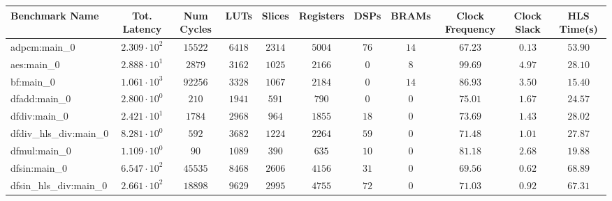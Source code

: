 \begin{tabular}{|l|c|c|c|c|c|c|c|c|c|c|}
\hline
Benchmark Name          & Tot. Latency           & Num Cycles & LUTs      & Slices    & Registers & DSPs    & BRAMs   & Clock Frequency & Clock Slack & HLS Time(s) \\
\hline
adpcm:main\_0           & $ 2.309 \cdot 10^{2} $ & $ 15522  $ & $ 6418  $ & $ 2314  $ & $ 5004  $ & $ 76  $ & $ 14  $ & $ 67.23       $ & $ 0.13    $ & $ 53.90   $ \\
aes:main\_0             & $ 2.888 \cdot 10^{1} $ & $ 2879   $ & $ 3162  $ & $ 1025  $ & $ 2166  $ & $ 0   $ & $ 8   $ & $ 99.69       $ & $ 4.97    $ & $ 28.10   $ \\
bf:main\_0              & $ 1.061 \cdot 10^{3} $ & $ 92256  $ & $ 3328  $ & $ 1067  $ & $ 2184  $ & $ 0   $ & $ 14  $ & $ 86.93       $ & $ 3.50    $ & $ 15.40   $ \\
dfadd:main\_0           & $ 2.800 \cdot 10^{0} $ & $ 210    $ & $ 1941  $ & $ 591   $ & $ 790   $ & $ 0   $ & $ 0   $ & $ 75.01       $ & $ 1.67    $ & $ 24.57   $ \\
dfdiv:main\_0           & $ 2.421 \cdot 10^{1} $ & $ 1784   $ & $ 2968  $ & $ 964   $ & $ 1855  $ & $ 18  $ & $ 0   $ & $ 73.69       $ & $ 1.43    $ & $ 28.02   $ \\
dfdiv\_hls\_div:main\_0 & $ 8.281 \cdot 10^{0} $ & $ 592    $ & $ 3682  $ & $ 1224  $ & $ 2264  $ & $ 59  $ & $ 0   $ & $ 71.48       $ & $ 1.01    $ & $ 27.87   $ \\
dfmul:main\_0           & $ 1.109 \cdot 10^{0} $ & $ 90     $ & $ 1089  $ & $ 390   $ & $ 635   $ & $ 10  $ & $ 0   $ & $ 81.18       $ & $ 2.68    $ & $ 19.88   $ \\
dfsin:main\_0           & $ 6.547 \cdot 10^{2} $ & $ 45535  $ & $ 8468  $ & $ 2606  $ & $ 4156  $ & $ 31  $ & $ 0   $ & $ 69.56       $ & $ 0.62    $ & $ 68.89   $ \\
dfsin\_hls\_div:main\_0 & $ 2.661 \cdot 10^{2} $ & $ 18898  $ & $ 9629  $ & $ 2995  $ & $ 4755  $ & $ 72  $ & $ 0   $ & $ 71.03       $ & $ 0.92    $ & $ 67.31   $ \\

\end{tabular}
